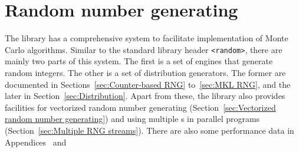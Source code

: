 %
%
%
%

\chapter{Random number generating}
\label{chap:Random number generating}

The library has a comprehensive \rng system to facilitate implementation of
Monte Carlo algorithms. Similar to the standard library header \verb|<random>|,
there are mainly two parts of this system. The first is a set of \rng{} engines
that generate random integers. The other is a set of distribution generators.
The former are documented in Sections~\ref{sec:Counter-based RNG}
to~\ref{sec:MKL RNG}, and the later in Section~\ref{sec:Distribution}. Apart
from these, the library also provides facilities for vectorized random number
generating (Section~\ref{sec:Vectorized random number generating}) and using
multiple \rng{}s in parallel programs (Section~\ref{sec:Multiple RNG streams}).
There are also some performance data in Appendices~ and~

